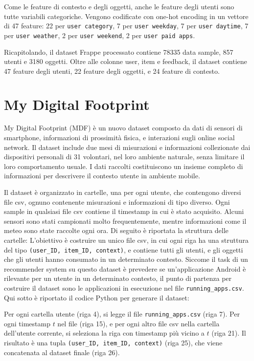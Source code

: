 \documentclass[12pt,italian]{report}
\begin{document}
\bigskip \noindent
Come le feature di contesto e degli oggetti, anche le feature degli utenti sono tutte variabili categoriche. Vengono codificate con one-hot encoding in un vettore di 47 feature: 22 per \texttt{user category}, 7 per \texttt{user weekday}, 7 per \texttt{user daytime}, 7 per \texttt{user weather}, 2 per \texttt{user weekend}, 2 per \texttt{user paid apps}.

Ricapitolando, il dataset Frappe processato contiene 78335 data sample, 857 utenti e 3180 oggetti. Oltre alle colonne user, item e feedback, il dataset contiene 47 feature degli utenti, 22 feature degli oggetti, e 24 feature di contesto.

\section{My Digital Footprint}
My Digital Footprint (MDF) \cite{mdf} è un nuovo dataset composto da dati di sensori di smartphone, informazioni di prossimità fisica, e interazioni sugli online social network. Il dataset include due mesi di misurazioni e informazioni collezionate dai dispositivi personali di 31 volontari, nel loro ambiente naturale, senza limitare il loro comportamento usuale. I dati raccolti costituiscono un insieme completo di informazioni per descrivere il contesto utente in ambiente mobile. 

Il dataset è organizzato in cartelle, una per ogni utente, che contengono diversi file csv, ognuno contenente misurazioni e informazioni di tipo diverso. Ogni sample in qualsiasi file csv contiene il timestamp in cui è stato acquisito. Alcuni sensori sono stati campionati molto frequentemente, mentre informazioni come il meteo sono state raccolte ogni ora.
Di seguito è riportata la struttura delle cartelle:
\noindent
L'obiettivo è costruire un unico file csv, in cui ogni riga ha una struttura del tipo \texttt{(user\_ID, item\_ID, context)}, e contiene tutti gli utenti, e gli oggetti che gli utenti hanno consumato in un determinato contesto. Siccome il task di un recommender system su questo dataset è prevedere se un'applicazione Android è rilevante per un utente in un determinato contesto, il punto di partenza per costruire il dataset sono le applicazioni in esecuzione nel file \texttt{running\_apps.csv}. Qui sotto è riportato il codice Python per generare il dataset: 

Per ogni cartella utente (riga 4), si legge il file \texttt{running\_apps.csv} (riga 7). Per ogni timestamp $t$ nel file (riga 15), e per ogni altro file csv nella cartella dell'utente corrente, si seleziona la riga con timestamp più vicino a $t$ (riga 21). Il risultato è una tupla \texttt{(user\_ID, item\_ID, context)} (riga 25), che viene concatenata al dataset finale (riga 26).
\end{document}
